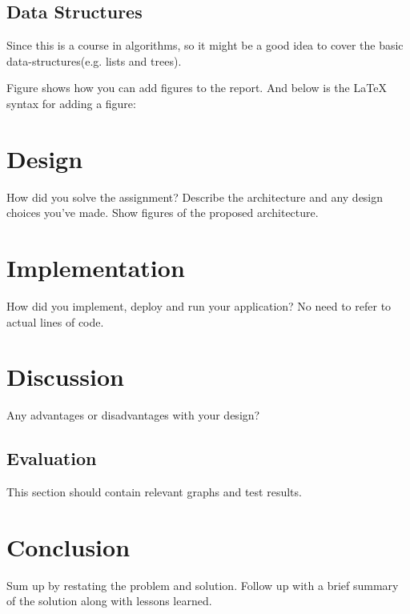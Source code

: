 \subsection{Data Structures}

Since this is a course in algorithms, so it might be a good idea to cover the
basic data-structures(e.g. lists and trees). 

Figure shows how you can add figures to the report. And below is the LaTeX
syntax for adding a figure:

\section{Design}

How did you solve the assignment? Describe the architecture and any design
choices you've made. Show figures of the proposed architecture.

\section{Implementation}

How did you implement, deploy and run your application? No need to refer to
actual lines of code.

\section{Discussion}

Any advantages or disadvantages with your design?

\subsection{Evaluation}

This section should contain relevant graphs and test results.

\section{Conclusion}

Sum up by restating the problem and solution. Follow up with a brief summary of
the solution along with lessons learned. \cite{10.1145/2673577}


\printbibliography


